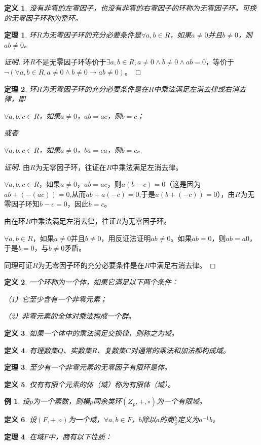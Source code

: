 \documentclass{article}
\newtheorem{Def}{定义}
\newtheorem{Thm}{定理}
\newtheorem*{Example}{例}
\begin{document}
\begin{CJK*}{UTF8}{gbsn}
\begin{Def}
  没有非零的左零因子，也没有非零的右零因子的环称为无零因子环。可换的无零因子环称为整环。
\end{Def}

\begin{Thm}
  环$R$为无零因子环的充分必要条件是$\forall a,b \in R$，如果$a\neq 0$并且$b\neq 0$，则$ab\neq 0$。
\end{Thm}
\begin{proof}[证明]
  环$R$不是无零因子环等价于$\exists a,b\in R, a\neq 0\land b\neq 0\land ab=0$，等价于$\lnot (\forall a,b\in R,a\neq 0\land b\neq 0 \to ab\neq 0)$。
\end{proof}
\begin{Thm}
  环$R$为无零因子环的充分必要条件是在$R$中乘法满足左消去律或右消去律，即

  $\forall a,b,c\in R$，如果$a\neq 0$，$ab=ac$，则$b=c$；

  或者

  $\forall a,b,c\in R$，如果$a\neq 0$，$ba=ca$，则$b=c$。

\end{Thm}
\begin{proof}[证明]
  由$R$为无零因子环，往证在$R$中乘法满足左消去律。

  $\forall a,b,c\in R$，如果$a\neq 0$，$ab=ac$，则$a(b-c)=0$（这是因为$ab+(-(ac))=0$,从而$ab+a(-c)=0$,于是$a(b+(-c))=0$），由$R$为无零因子环知$b-c=0$，因此$b=c$。

  由在环$R$中乘法满足左消去律，往证$R$为无零因子环。


  $\forall a,b\in R$，如果$a\neq 0$并且$b\neq 0$，用反证法证明$ab\neq 0$。如果$ab=0$，则$ab=a0$，于是$b=0$，与$b\neq 0$矛盾。

  同理可证$R$为无零因子环的充分必要条件是在$R$中满足右消去律。
\end{proof}
\begin{Def}
  一个环称为一个体，如果它满足以下两个条件：

  （1）它至少含有一个非零元素；

  （2）非零元素的全体对乘法构成一个群。
\end{Def}

\begin{Def}
  如果一个体中的乘法满足交换律，则称之为域。
\end{Def}
\begin{Def}
  有理数集$Q$、实数集$R$、复数集$C$对通常的乘法和加法都构成域。
\end{Def}
\begin{Thm}
  至少有一个非零元素的无零因子有限环是体。
\end{Thm}
\begin{Def}
  仅有有限个元素的体（域）称为有限体（域）。
\end{Def}
\begin{Example}
  设$p$为一个素数，则模$p$同余类环$(Z_p,+,\circ)$为一个有限域。
\end{Example}
\begin{Def}
  设$(F,+,\circ)$为一个域，$\forall a,b\in F$，$b$除以$a$的商$\frac{b}{a}$定义为$a^{-1}b$。
\end{Def}
\begin{Thm}
  在域$F$中，商有以下性质：


\end{Thm}
\end{CJK*}
\end{document}
